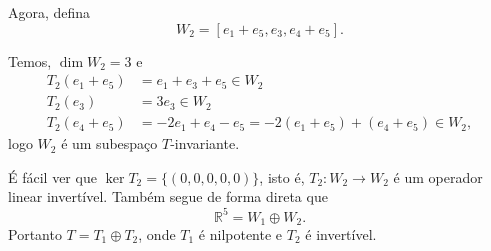 \documentclass[12pt]{article}
\newcommand{\real}{\mathbb{R}}
\begin{document}
Agora, defina
\[
	W_2 = [e_1 + e_5, e_3, e_4 + e_5].
\]

Temos, $\dim W_2 = 3$ e
\begin{align*}
	T_2(e_1 + e_5) &= e_1 + e_3 + e_5 \in W_2\\
	T_2(e_3) &= 3e_3 \in W_2\\
	T_2(e_4 + e_5) &= -2e_1 + e_4 - e_5 = -2(e_1 + e_5) + (e_4 + e_5) \in W_2,
\end{align*}
logo $W_2$ é um subespaço $T$-invariante.

É fácil ver que $\ker T_2 = \{(0,0,0,0,0)\}$, isto é, $T_2 : W_2 \to W_2$ é um operador linear invertível. Também segue de forma direta que
\[
    \real^5 = W_1 \oplus W_2.
\]
Portanto $T = T_1 \oplus T_2$, onde $T_1$ é nilpotente e $T_2$ é invertível.
\end{document}

